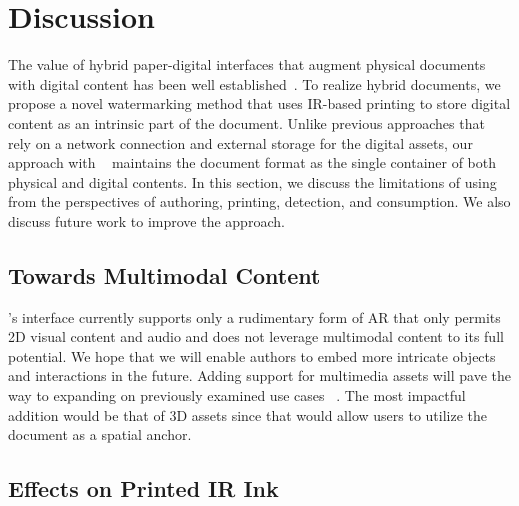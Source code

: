 \section{Discussion}


The value of hybrid paper-digital interfaces that augment physical documents with digital content has been well established~\cite{han_hybrid_2021}. To realize hybrid documents, we propose a novel watermarking method that uses IR-based printing to store digital content as an intrinsic part of the document. Unlike previous approaches that rely on a network connection and external storage for the digital assets, our approach with \systemName~ maintains the document format as the single container of both physical and digital contents. 
In this section, we discuss the limitations of using \systemName~ from the perspectives of authoring, printing, detection, and consumption. We also discuss future work to improve the approach.



\subsection{Towards Multimodal Content}
\systemName's interface currently supports only a rudimentary form of AR that only permits 2D visual content and audio and does not leverage multimodal content to its full potential. We hope that we will enable authors to embed more intricate objects and interactions in the future. Adding support for multimedia assets will pave the way to expanding on previously examined use cases ~\cite{alessandrini_audio-augmented_2014, rajaram_paper_2022}. The most impactful addition would be that of 3D assets since that would allow users to utilize the document as a spatial anchor. 



\subsection{Effects on Printed IR Ink}




